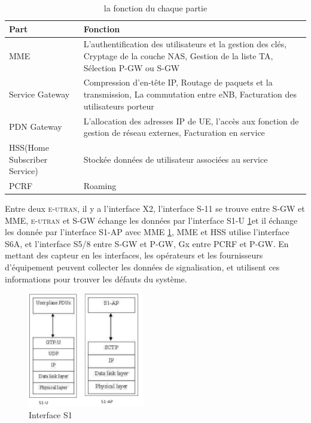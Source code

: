 \begin{table}[H]
	\begin{tabular}{|>{\centering\arraybackslash}p{2cm}|>{\centering\arraybackslash}p{11 cm}|}
		\hline Part &                     Fonction\\
		\hline MME & 
			L'authentification des utilisateurs et la gestion des clés,  Cryptage de la couche NAS,  Gestion de la liste TA, Sélection P-GW ou S-GW \\ 
		\hline Service Gateway & Compression d'en-tête IP, Routage de paquets et la transmission, La commutation entre eNB, Facturation des utilisateurs porteur \\ 
		\hline PDN Gateway & L'allocation des adresses IP de UE, l'accès aux fonction de gestion de réseau externes, Facturation en service \\ 
		\hline HSS(Home Subscriber Service) & Stockée données de utilisateur associées au service \\ 
		\hline PCRF & Roaming \\ 
		\hline 
	\end{tabular} 
	\caption{la fonction du chaque partie}
	\label{founction du chaque partie}
\end{table}    

Entre deux \textsc{e-utran}, il y a l'interface X2, l'interface S-11 se trouve entre S-GW et MME, \textsc{e-utran} et S-GW échange les données par l'interface S1-U \ref{Fig.S1}et il échange les donnée par l'interface S1-AP avec MME \ref{Fig.S1}, MME et HSS utilise l'interface S6A, et l'interface S5/8 entre S-GW et P-GW, Gx entre PCRF et P-GW. En mettant des capteur en les interfaces, les opérateurs et les fournisseurs d'équipement peuvent collecter les données de signalisation, et utilisent ces informations pour trouver les défauts du système. 
      \begin{figure}[H]
          \centering
          \includegraphics[width=2in]{images/S1-U.png}
          \caption{Interface S1}
          \label{Fig.S1}
      \end{figure}

